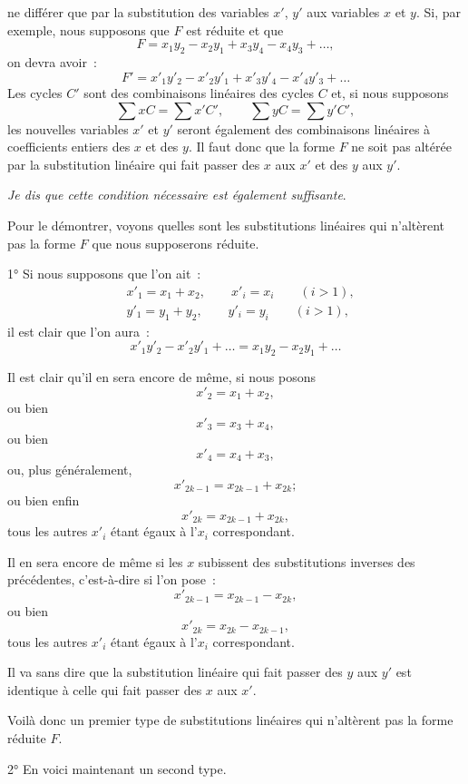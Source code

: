 \documentclass{article}
\begin{document}
ne différer que par la substitution des variables $x'$, $y'$ aux variables $x$ et $y$. Si, par exemple, nous supposons que $F$ est réduite et que
\[ F = x_{1}y_{2} - x_{2}y_{1} + x_{3}y_{4} - x_{4}y_{3} + \ldots, \]
on devra avoir~:
\[ F' = x'_{1}y'_{2} - x'_{2}y'_{1} + x'_{3}y'_{4} - x'_{4}y'_{3} + \ldots \]
Les cycles $C'$ sont des combinaisons linéaires des cycles $C$ et, si nous supposons
\[ \sum x C = \sum x' C', \qquad \sum y C = \sum y' C', \]
les nouvelles variables $x'$ et $y'$ seront également des combinaisons linéaires à coefficients entiers des $x$ et des $y$. Il faut donc que la forme $F$ ne soit pas altérée par la substitution linéaire qui fait passer des $x$ aux $x'$ et des $y$ aux $y'$.

\emph{Je dis que cette condition nécessaire est également suffisante}.

Pour le démontrer, voyons quelles sont les substitutions linéaires qui n'altèrent pas la forme $F$ que nous supposerons réduite.

1° Si nous supposons que l'on ait~:
\[ \begin{aligned} &x'_{1} = x_{1} + x_{2}, \qquad x'_{i} = x_{i} \qquad (i > 1),\\ &y'_{1} = y_{1} + y_{2}, \qquad y'_{i} = y_{i} \qquad (i > 1), \end{aligned} \]
il est clair que l'on aura~:
\[ x'_{1}y'_{2} - x'_{2}y'_{1} + \ldots = x_{1}y_{2} - x_{2}y_{1} + \ldots \]

Il est clair qu'il en sera encore de même, si nous posons
\[ x'_{2} = x_{1} + x_{2}, \]
ou bien
\[ x'_{3} = x_{3} + x_{4}, \]
ou bien
\[ x'_{4} = x_{4} + x_{3}, \]
ou, plus généralement,
\[ x'_{2k-1} = x_{2k-1} + x_{2k}; \]
ou bien enfin
\[ x'_{2k} = x_{2k-1} + x_{2k}, \]
tous les autres $x'_{i}$ étant égaux à l'$x_{i}$ correspondant.

Il en sera encore de même si les $x$ subissent des substitutions inverses des précédentes, c'est-à-dire si l'on pose~:
\[ x'_{2k-1} = x_{2k-1} - x_{2k}, \]
ou bien
\[ x'_{2k} = x_{2k} - x_{2k-1}, \]
tous les autres $x'_{i}$ étant égaux à l'$x_{i}$ correspondant.


Il va sans dire que la substitution linéaire qui fait passer des $y$ aux $y'$ est identique à celle qui fait passer des $x$ aux $x'$.

Voilà donc un premier type de substitutions linéaires qui n'altèrent pas la forme réduite $F$.

2° En voici maintenant un second type.
\end{document}
